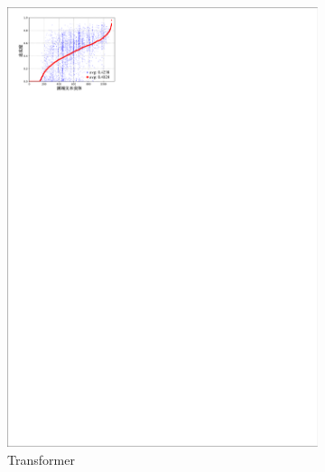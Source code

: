 
\begin{figure}[!htbp]
    \centering
    \begin{subfigure}[b]{0.5\textwidth}
      \includegraphics[width=\textwidth]{Img/fig_4_fidelity_base.pdf}
      \caption{Transformer}
      \label{fig:4_fidelity_base}
    \end{subfigure}%
    ~%
    \begin{subfigure}[b]{0.5\textwidth}

\end{subfigure}
\end{figure}
